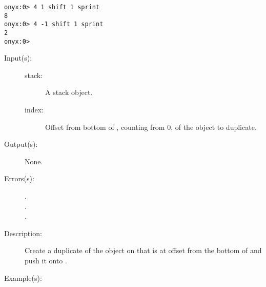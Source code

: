 \begin{description}
\begin{description}
\begin{verbatim}
onyx:0> 4 1 shift 1 sprint
8
onyx:0> 4 -1 shift 1 sprint
2
onyx:0>
		\end{verbatim}
	\end{description}
\label{systemdict:sibdup}
\item[{\onyxop{stack index}{sibdup}{--}}: ]
	\begin{description}\item[]
	\item[Input(s): ]
		\begin{description}\item[]
		\item[stack: ]
			A stack object.
		\item[index: ]
			Offset from bottom of , counting from 0, of
			the object to duplicate.
		\end{description}
	\item[Output(s): ] None.
	\item[Errors(s): ]
		\begin{description}\item[]
		\item[.]
		\item[.]
		\item[.]
		\end{description}
	\item[Description: ]
		Create a duplicate of the object on  that is at
		offset  from the bottom of  and push
		it onto .
	\item[Example(s): ]\begin{verbatim}


\end{verbatim}
\end{description}
\end{description}
